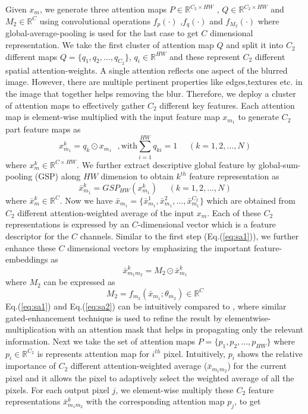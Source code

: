 \documentclass[10pt,twocolumn,letterpaper]{article}
\begin{document}
\par Given $x_m$, we generate three attention maps $P \in \mathbb{R}^{C_2 \times HW}$ , $Q \in \mathbb{R}^{C_2 \times HW}$ and $M_2 \in \mathbb{R}^{C}$ using convolutional operations $f_p(\cdot)$ ,$f_q(\cdot)$ and $f_{M_2}(\cdot)$ where global-average-pooling is used for the last case to get $C$ dimensional representation.  We take the first cluster of attention map $Q$ and split it into $C_2$ different maps $Q =\{q_1,q_2,...,q_{C_2}\}$, $q_i \in \mathbb{R}^{HW}$ and these represent $C_2$ different spatial attention-weights. A single attention reflects one aspect of the blurred image. However, there are multiple pertinent properties like edges,textures etc. in the image  that together helps removing the blur. Therefore, we deploy a cluster of attention maps to effectively gather $C_2$ different key features. Each attention map is element-wise multiplied with the input feature map $x_{m_1}$ to generate $C_2$ part feature maps as
\begin{equation}
    x^k_{m_1} = q_k \odot x_{m_1} ~ ~ ~ , \text{with}  \sum_{i=1}^{HW} q_{ki} = 1 ~ ~ ~ ~ ~ ~(k= 1,2,...,N)
\end{equation}
where $x^k_m \in \mathbb{R}^{C \times HW}$. We further extract descriptive global feature by global-sum-pooling (GSP) along $HW$ dimension to obtain $k^{th}$ feature representation as 
\begin{equation}
    \bar{x}^k_{m_1} = GSP_{HW}(x^k_{m_1}) ~ ~ ~ ~ ~ ~(k= 1,2,...,N)
\end{equation}
where $\bar{x}^k_m \in \mathbb{R}^C$. Now we have $\bar{x}_{m_1} = \{\bar{x}^1_{m_1},\bar{x}^2_{m_1},...,\bar{x}^{C_2}_{m_1}\}$ which are obtained from $C_2$ different attention-weighted average of the input $x_m$. Each of these $C_2$ representations is expressed by an $C$-dimensional vector which is a feature descriptor for the $C$ channels. Similar to the first step (Eq.(\ref{eq:sa1})), we further enhance these $C$ dimensional vectors by emphasizing the important feature-embeddings as
\begin{equation}\label{eq:sa2}
    \bar{x}^k_{{m_1}{m_2}} = M_2 \odot \bar{x}^k_{m_1}
\end{equation}
where $M_2$ can be expressed as
\begin{equation}
     M_2 = f_{m_2}(\bar{x}_{m_1};\theta_{m_2}) \in \mathbb{R}^C
\end{equation}
Eq.(\ref{eq:sa1}) and Eq.(\ref{eq:sa2}) can be intuitively compared to \cite{huang2019attention}, where similar gated-enhancement technique is used to refine the result by elementwise-multiplication with an attention mask that helps in propagating only the relevant information. Next we take the set of attention maps $P = \{p_1,p_2,...,p_{HW}\}$ where $p_i \in \mathbb{R}^{C_2}$ is represents attention map for $i^{th}$ pixel. Intuitively, $p_i$ shows the relative importance of $C_2$ different attention-weighted average ($\bar{x}_{{m_1}{m_2}}$) for the current pixel and it allows the pixel to adaptively select the weighted average of all the pixels. For each output pixel $j$, we element-wise multiply these $C_2$ feature representations $\bar{x}^k_{{m_1}{m_2}}$ with the corresponding attention map $p_j$, to get
\end{document}
